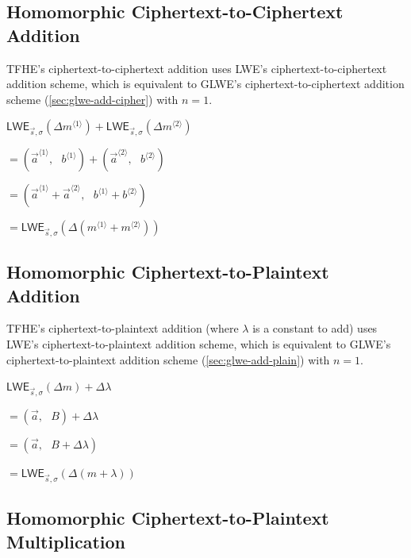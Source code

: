 \subsection{Homomorphic Ciphertext-to-Ciphertext Addition}
\label{subsec:tfhe-add-cipher}

TFHE's ciphertext-to-ciphertext addition uses LWE's ciphertext-to-ciphertext addition scheme, which is equivalent to GLWE's ciphertext-to-ciphertext addition scheme (\autoref{sec:glwe-add-cipher}) with $n = 1$.  


\begin{tcolorbox}[title={\textbf{\tboxlabel{\ref*{subsec:tfhe-add-cipher}} TFHE Ciphertext-to-Ciphertext Addition}}]
$\textsf{LWE}_{\vec{s}, \sigma}(\Delta m^{\langle 1 \rangle} ) + \textsf{LWE}_{\vec{s}, \sigma}(\Delta m^{\langle 2 \rangle} ) $

$ = ( \vec{a}^{\langle 1 \rangle}, \text{ } b^{\langle 1 \rangle}) + (\vec{a}^{\langle 2 \rangle}, \text{ } b^{\langle 2 \rangle}) $

$ = ( \vec{a}^{\langle 1 \rangle} + \vec{a}^{\langle 2 \rangle}, \text{ } b^{\langle 1 \rangle} + b^{\langle 2 \rangle} ) $

$= \textsf{LWE}_{\vec{s}, \sigma}(\Delta(m^{\langle 1 \rangle} + m^{\langle 2 \rangle}) )$
\label{Here}
\end{tcolorbox}


\subsection{Homomorphic Ciphertext-to-Plaintext Addition}
\label{subsec:tfhe-add-plain}

TFHE's ciphertext-to-plaintext addition (where $\lambda$ is a constant to add) uses LWE's ciphertext-to-plaintext addition scheme, which is equivalent to GLWE's ciphertext-to-plaintext addition scheme (\autoref{sec:glwe-add-plain}) with $n = 1$.  

\begin{tcolorbox}[title={\textbf{\tboxlabel{\ref*{subsec:tfhe-add-plain}} TFHE Ciphertext-to-Plaintext Addition}}]
$\textsf{LWE}_{\vec{s}, \sigma}(\Delta m) + \Delta \lambda $

$=  (\vec{a}, \text{ } B) + \Delta \lambda$

$=  (\vec{a}, \text{ } B + \Delta\lambda)$

$= \textsf{LWE}_{\vec{s}, \sigma}(\Delta (m + \lambda) )$
\end{tcolorbox}


\subsection{Homomorphic Ciphertext-to-Plaintext Multiplication}
\label{subsec:tfhe-mult-plain}

